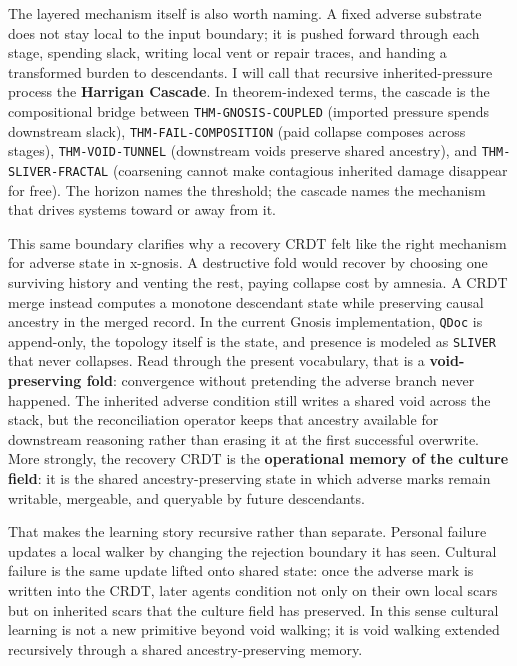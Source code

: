 \documentclass[
  11pt,
]{article}
\begin{document}
The layered mechanism itself is also worth naming. A fixed adverse
substrate does not stay local to the input boundary; it is pushed
forward through each stage, spending slack, writing local vent or repair
traces, and handing a transformed burden to descendants. I will call
that recursive inherited-pressure process the \textbf{Harrigan Cascade}.
In theorem-indexed terms, the cascade is the compositional bridge
between \texttt{THM-GNOSIS-COUPLED} (imported pressure spends downstream
slack), \texttt{THM-FAIL-COMPOSITION} (paid collapse composes across
stages), \texttt{THM-VOID-TUNNEL} (downstream voids preserve shared
ancestry), and \texttt{THM-SLIVER-FRACTAL} (coarsening cannot make
contagious inherited damage disappear for free). The horizon names the
threshold; the cascade names the mechanism that drives systems toward or
away from it.

This same boundary clarifies why a recovery CRDT felt like the right
mechanism for adverse state in x-gnosis. A destructive fold would
recover by choosing one surviving history and venting the rest, paying
collapse cost by amnesia. A CRDT merge instead computes a monotone
descendant state while preserving causal ancestry in the merged record.
In the current Gnosis implementation, \texttt{QDoc} is append-only, the
topology itself is the state, and presence is modeled as
\texttt{SLIVER} that never collapses. Read through the present
vocabulary, that is a \textbf{void-preserving fold}: convergence without
pretending the adverse branch never happened. The inherited adverse
condition still writes a shared void across the stack, but the
reconciliation operator keeps that ancestry available for downstream
reasoning rather than erasing it at the first successful overwrite. More
strongly, the recovery CRDT is the \textbf{operational memory of the
culture field}: it is the shared ancestry-preserving state in which
adverse marks remain writable, mergeable, and queryable by future
descendants.

That makes the learning story recursive rather than separate. Personal
failure updates a local walker by changing the rejection boundary it has
seen. Cultural failure is the same update lifted onto shared state: once
the adverse mark is written into the CRDT, later agents condition not
only on their own local scars but on inherited scars that the culture
field has preserved. In this sense cultural learning is not a new
primitive beyond void walking; it is void walking extended recursively
through a shared ancestry-preserving memory.
\end{document}
